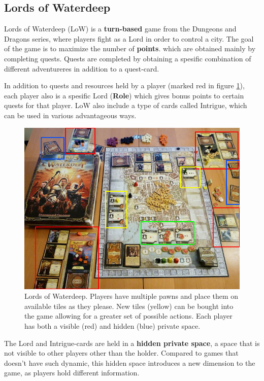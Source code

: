 \subsection{Lords of Waterdeep} \label{subsec:LoW}
Lords of Waterdeep (LoW) is a \textbf{turn-based} game from the Dungeons and Dragons series, where players fight as a Lord in order to control a city. The goal of the game is to maximize the number of \textbf{points}. which are obtained mainly by completing quests. Quests are completed by obtaining a spesific combination of different adventureres in addition to a quest-card. 

In addition to quests and resources held by a player (marked red in figure \ref{fig:lords_board}), each player also is a spesific Lord (\textbf{Role}) which gives bonus points to certain quests for that player. LoW also include a type of cards called Intrigue, which can be used in various advantageous ways.

\begin{figure}[ht]
\includegraphics[width=12cm]{img/lords_board_marked}
\centering
\caption{Lords of Waterdeep. Players have multiple pawns and place them on available tiles as they please. New tiles (yellow) can be bought into the game allowing for a greater set of possible actions. Each player has both a visible (red) and hidden (blue) private space.}
\label{fig:lords_board}
\end{figure}

The Lord and Intrigue-cards are held in a \textbf{hidden private space}, a space that is not visible to other players other than the holder. Compared to games that doesn't have such dynamic, this hidden space introduces a new dimension to the game, as players hold different information.

